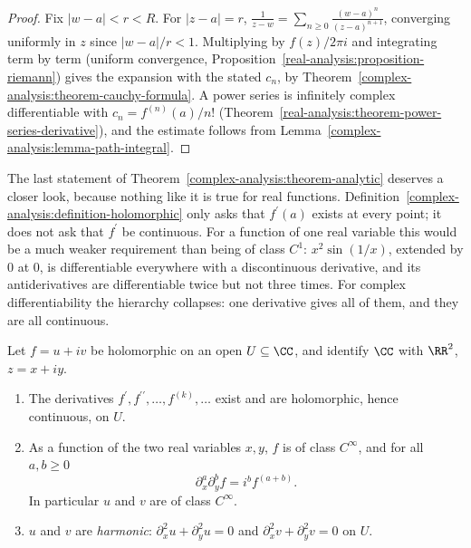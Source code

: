 \begin{proof}
Fix $|w - a| < r < R$. For $|z - a| = r$, $\frac{1}{z - w} = \sum_{n \geq 0}\frac{(w - a)^n}{(z - a)^{n+1}}$, converging uniformly in $z$ since $|w - a|/r < 1$. Multiplying by $f(z)/2\pi i$ and integrating term by
term (uniform convergence, Proposition~\ref{real-analysis:proposition-riemann}) gives the expansion with the stated $c_n$, by Theorem~\ref{complex-analysis:theorem-cauchy-formula}. A power series is
infinitely complex differentiable with $c_n = f^{(n)}(a)/n!$ (Theorem~\ref{real-analysis:theorem-power-series-derivative}), and the estimate follows from
Lemma~\ref{complex-analysis:lemma-path-integral}.
\end{proof}

The last statement of Theorem~\ref{complex-analysis:theorem-analytic} deserves a closer look, because nothing like it is true for real functions. Definition~\ref{complex-analysis:definition-holomorphic} only
asks that $f^{\prime}(a)$ exists at every point; it does not ask that $f^{\prime}$ be continuous. For a function of one real variable this would be a much weaker requirement than being of class $C^1$:
$x^2\sin(1/x)$, extended by $0$ at $0$, is differentiable everywhere with a discontinuous derivative, and its antiderivatives are differentiable twice but not three times. For complex differentiability
the hierarchy collapses: one derivative gives all of them, and they are all continuous.

\begin{corollary}\label{complex-analysis:corollary-smooth-harmonic}
Let $f = u + iv$ be holomorphic on an open $U \subseteq \CC$, and identify $\CC$ with $\RR^2$, $z = x + iy$.
\begin{enumerate}
\item The derivatives $f^{\prime}, f^{\prime\prime}, \ldots, f^{(k)}, \ldots$ exist and are holomorphic, hence continuous, on $U$.
\item As a function of the two real variables $x, y$, $f$ is of class $C^\infty$, and for all $a, b \geq 0$
\[
\partial_x^a\partial_y^bf = i^bf^{(a + b)} .
\]
In particular $u$ and $v$ are of class $C^\infty$.
\item $u$ and $v$ are \emph{harmonic}: $\partial_x^2u + \partial_y^2u = 0$ and $\partial_x^2v + \partial_y^2v = 0$ on $U$.
\end{enumerate}
\end{corollary}

